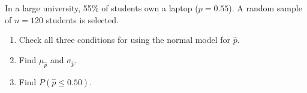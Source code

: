 \documentclass[10pt]{article}
\begin{document}
\namedateperiod

\vspace{0.15in}

In a large university, 55\% of students own a laptop ($p = 0.55$). A random sample of
$n = 120$ students is selected.

\begin{enumerate}
  \item Check all three conditions for using the normal model for $\hat{p}$.

  \item Find $\mu_{\hat{p}}$ and $\sigma_{\hat{p}}$.
        \vspace{0.6in}

  \item Find $P(\hat{p} \le 0.50)$.
        \vspace{0.9in}
\end{enumerate}
\end{document}
